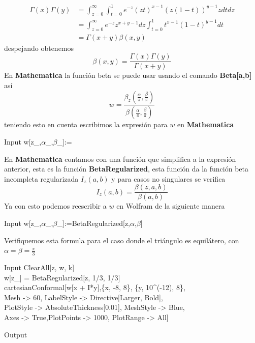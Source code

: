 \[
	\displaystyle {\begin{aligned}\Gamma (x)\Gamma (y)&=\int _{z=0}^{\infty }\int _{t=0}^{1}e^{-z}(zt)^{x-1}(z(1-t))^{y-1}zdtdz\\&=\int _{z=0}^{\infty }e^{-z}z^{x+y-1}dz\int _{t=0}^{1}t^{x-1}(1-t)^{y-1}dt\\&=\Gamma (x+y)\beta (x,y)\end{aligned}}
\]
despejando obtenemos
\[
	{\displaystyle \beta (x,y)={\frac {\Gamma (x)\Gamma (y)}{\Gamma (x+y)}}}
\]
En \textbf{Mathematica} la función beta se puede usar usando el comando \textbf{Beta[a,b]}
así 
$$w=\dfrac{\beta_z\left(\frac{\alpha}{\pi},\frac{\beta}{\pi}\right)}{\beta\left(\frac{\alpha}{\pi},\frac{\beta}{\pi}\right)}$$
teniendo esto en cuenta escribimos la expresión para $w$ en \textbf{Mathematica}
\begin{mmaCell}{Input}
    w[z_,\(\alpha\)_,\(\beta\)_]:=
\end{mmaCell}
En \textbf{Mathematica} contamos con una función que simplifica a la expresión anterior, esta es la función \textbf{BetaRegularized}, esta función da la función beta incompleta regularizada $I_z(a,b)$  y para casos no singulares se verifica 
$$I_z(a,b)=\dfrac{\beta(z,a,b)}{\beta(a,b)}$$
Ya con esto podemos reescribir a $w$ en Wolfram de la siguiente manera
\begin{mmaCell}{Input}
	 w[z_,\(\alpha\)_,\(\beta\)_]:=BetaRegularized[z,\(\alpha\),\(\beta\)]
\end{mmaCell}
Verifiquemos esta formula para el caso donde el triángulo es equilátero, con $\alpha=\beta=\frac{\pi}{3}$
\begin{mmaCell}{Input}
  ClearAll[z, w, k]\\w[z_] = BetaRegularized[z, 1/3, 1/3]\\cartesianConformal[w[x + I*y],\{x, -8, 8\}, \{y, 10^(-12), 8\},\\Mesh -> 60, LabelStyle -> Directive[Larger, Bold],\\PlotStyle -> AbsoluteThickness[0.01], MeshStyle -> Blue,\\Axes -> True,PlotPoints -> 1000, PlotRange -> All]
\end{mmaCell}
\begin{mmaCell}[moregraphics={moreig={scale=0.8}}]{Output}
\end{mmaCell}
